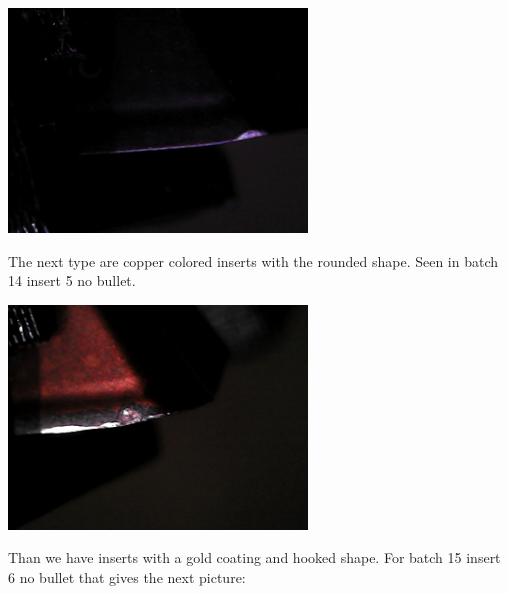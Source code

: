 \documentclass{article}
\begin{document}
\includegraphics[width=3.125000in, keepaspectratio=true]{./ZimFiles_files/Vision/Dataset/automated_datasets/2_created_datasets/2_Spaghetti_dataset/rounded_black_b_013_p_002_l_006-011_white_nb.png}



The next type are copper colored inserts with the rounded shape. Seen in batch 14 insert 5 no bullet.

\includegraphics[width=3.125000in, keepaspectratio=true]{./ZimFiles_files/Vision/Dataset/automated_datasets/2_created_datasets/2_Spaghetti_dataset/rounded_copper_b_014_p_005_l_006-011_white_nb.png}



Than we have inserts with a gold coating and hooked shape. For batch 15 insert 6 no bullet that gives the next picture:
\end{document}
